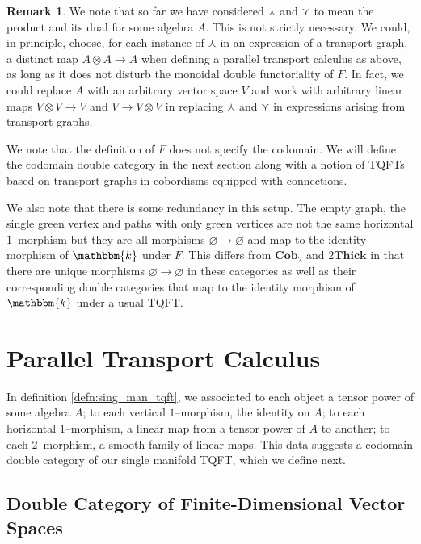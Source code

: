 \documentclass{amsart}
\newcommand{\K}{\mathbbm{k}}
\newcommand{\tensor}{\otimes}
\newcommand{\cwedge}{\curlywedge}
\newcommand{\cvee}{\curlyvee}
\renewcommand{\to}[1][]{\stackrel{#1}{\longrightarrow}}
\newcommand{\Cob}{\textbf{Cob}}
\newcommand{\Thick}{\textbf{Thick}}
\numberwithin{thm}{section}
\theoremstyle{definition}
\newtheorem{rmk}[thm]{Remark}
\begin{document}
\begin{rmk}\label{rmk:any_vect_space}
We note that so far we have considered $\cwedge$ and $\cvee$ to mean the product
and its dual for some algebra $A$. This is not strictly necessary. We could, in
principle, choose, for each instance of $\cwedge$ in an expression of a
transport graph, a distinct map $A \tensor A \to A$ when defining a parallel
transport calculus as above, as long as it does not disturb the monoidal double
functoriality of $F$. In fact, we could replace $A$ with an arbitrary vector
space $V$ and work with arbitrary linear maps $V \tensor V \to V$ and
$V \to V \tensor V$ in replacing $\cwedge$ and $\cvee$ in expressions arising
from transport graphs.
\end{rmk}

We note that the definition of $F$ does not specify the codomain. We will define
the codomain double category in the next section along with a notion of TQFTs
based on transport graphs in cobordisms equipped with connections.

We also note that there is some redundancy in this setup. The empty graph, the
single green vertex and paths with only green vertices are not the same
horizontal $1$--morphism but they are all morphisms
$\varnothing \to \varnothing$ and map to the identity morphism of $\K$ under
$F$. This differs from $\Cob_2$ and $2\Thick$ in that there are unique
morphisms $\varnothing \to \varnothing$ in these categories as well as their
corresponding double categories that map to the identity morphism of $\K$ under
a usual TQFT.


%

\section{Parallel Transport Calculus}

In definition \ref{defn:sing_man_tqft}, we associated to each object a tensor
power of some algebra $A$; to each vertical $1$--morphism, the identity on $A$;
to each horizontal $1$--morphism, a linear map from a tensor power of $A$ to
another; to each $2$--morphism, a smooth family of linear maps. This data
suggests a codomain double category of our single manifold TQFT, which we define
next.

%

\subsection{Double Category of Finite-Dimensional Vector Spaces}
\end{document}
